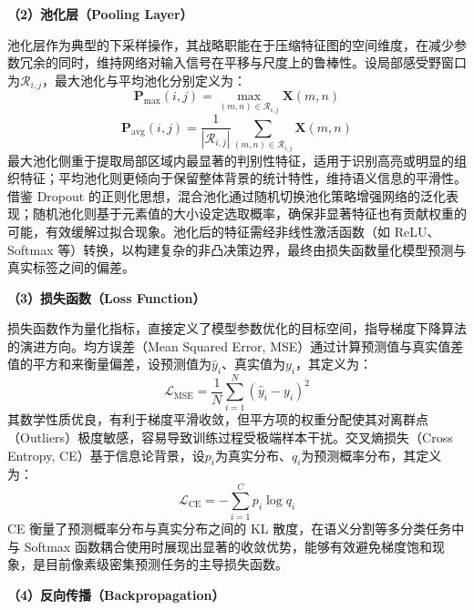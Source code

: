 \documentclass[12pt, a4paper, twoside]{article}
\begin{document}
\textbf{（2）池化层（Pooling Layer）}

池化层作为典型的下采样操作，其战略职能在于压缩特征图的空间维度，在减少参数冗余的同时，维持网络对输入信号在平移与尺度上的鲁棒性。设局部感受野窗口为$\mathcal{R}_{i,j}$，最大池化与平均池化分别定义为：
\begin{equation}
\mathbf{P}_{\max}(i,j) = \max_{(m,n)\in\mathcal{R}_{i,j}} \mathbf{X}(m,n)
\end{equation}
\begin{equation}
\mathbf{P}_{\text{avg}}(i,j) = \frac{1}{|\mathcal{R}_{i,j}|} \sum_{(m,n)\in\mathcal{R}_{i,j}} \mathbf{X}(m,n)
\end{equation}
最大池化侧重于提取局部区域内最显著的判别性特征，适用于识别高亮或明显的组织特征；平均池化则更倾向于保留整体背景的统计特性，维持语义信息的平滑性。借鉴 Dropout 的正则化思想，混合池化通过随机切换池化策略增强网络的泛化表现；随机池化则基于元素值的大小设定选取概率，确保非显著特征也有贡献权重的可能，有效缓解过拟合现象。池化后的特征需经非线性激活函数（如 ReLU、Softmax 等）转换，以构建复杂的非凸决策边界，最终由损失函数量化模型预测与真实标签之间的偏差。

\textbf{（3）损失函数（Loss Function）}

损失函数作为量化指标，直接定义了模型参数优化的目标空间，指导梯度下降算法的演进方向。均方误差（Mean Squared Error, MSE）通过计算预测值与真实值差值的平方和来衡量偏差，设预测值为$\hat{y}_i$、真实值为$y_i$，其定义为：
\begin{equation}
\mathcal{L}_{\text{MSE}} = \frac{1}{N}\sum_{i=1}^{N}\left(\hat{y}_i - y_i\right)^2
\end{equation}
其数学性质优良，有利于梯度平滑收敛，但平方项的权重分配使其对离群点（Outliers）极度敏感，容易导致训练过程受极端样本干扰。交叉熵损失（Cross Entropy, CE）基于信息论背景，设$p_i$为真实分布、$q_i$为预测概率分布，其定义为：
\begin{equation}
\mathcal{L}_{\text{CE}} = -\sum_{i=1}^{C} p_i \log q_i
\end{equation}
CE 衡量了预测概率分布与真实分布之间的 KL 散度，在语义分割等多分类任务中与 Softmax 函数耦合使用时展现出显著的收敛优势，能够有效避免梯度饱和现象，是目前像素级密集预测任务的主导损失函数。

\textbf{（4）反向传播（Backpropagation）}
\end{document}
